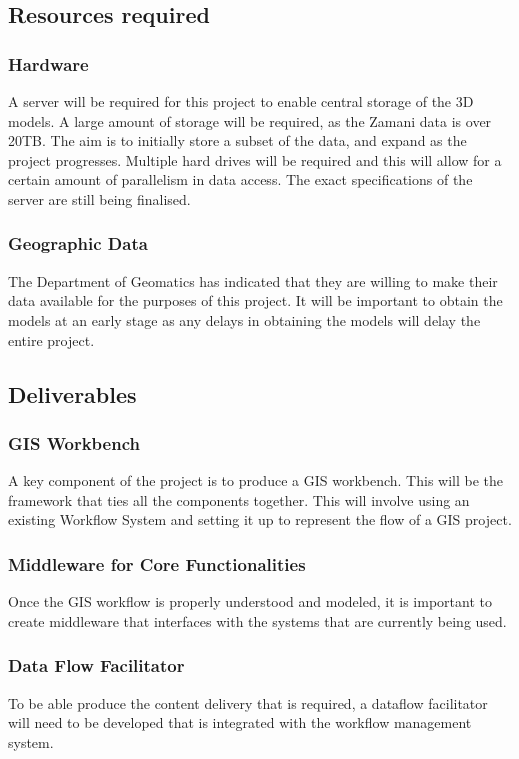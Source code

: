\documentclass[12pt,a4paper]{article}
\begin{document}
\subsection{Resources required}
\subsubsection*{Hardware}
A server will be required for this project to enable central storage of the 3D models.
A large amount of storage will be required, as the Zamani data is over 20TB. The aim
is to initially store a subset of the data, and expand as the project progresses.
Multiple hard drives will be required and this will allow for a certain amount of
parallelism in data access. The exact specifications of the server are still
being finalised.
\subsubsection*{Geographic Data}
The Department of Geomatics has indicated that they are willing to make their data
available for the purposes of this project. It will be important to obtain the
models at an early stage as any delays in obtaining the models will delay the entire project.
\subsection{Deliverables}
\subsubsection*{GIS Workbench}
A key component of the project is to produce a GIS workbench. This will
be the framework that ties all the components together. This will involve
using an existing Workflow System and setting it up to represent the
flow of a GIS project.
\subsubsection*{Middleware for Core Functionalities}
Once the GIS workflow is properly understood and modeled, it is
important to create middleware that interfaces with the systems that are
currently being used.
\subsubsection*{Data Flow Facilitator}
To be able produce the content delivery that is required, a dataflow
facilitator will need to be developed that is integrated with the
workflow management system.
\end{document}
